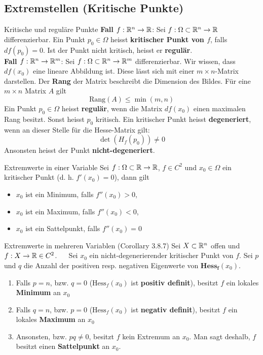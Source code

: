 \subsection{Extremstellen (Kritische Punkte)}

\begin{Definition}[label=R1]{Kritische und reguläre Punkte}{}
	\textbf{Fall $f: \mathbb{R}^n \to \mathbb{R}$}: Sei 	$f: \Omega \subset \mathbb{R}^n \to \mathbb{R}$ differenzierbar. Ein Punkt $p_0 \in \Omega$ heisst \textbf{kritischer Punkt von $f$}, falls $df(p_0)=0$. Ist der Punkt nicht kritisch, heisst er \textbf{regulär}.\\
	
	\textbf{Fall $f: \mathbb{R}^n \to \mathbb{R}^m$}: Sei $f: \Omega \subset \mathbb{R}^n \to \mathbb{R}^m$ differenzierbar. Wir wissen, dass $df(x_0)$ eine lineare Abbildung ist.
	Diese lässt sich mit einer $m\times n$-Matrix darstellen. Der \textbf{Rang} der Matrix beschreibt die Dimension des Bildes.
	Für eine $m \times n$ Matrix $A$ gilt \[\text{Rang}(A) \leq \min(m, n)\] Ein Punkt $p_0 \in \Omega$ heisst \textbf{regulär},
	wenn die Matrix $df(x_0)$ einen maximalen Rang besitzt. Sonst heisst $p_0$ kritisch.
	Ein kritischer Punkt heisst \textbf{degeneriert}, wenn an dieser Stelle für die Hesse-Matrix gilt:
	\[\det(H_f(p_0)) \neq 0\]
	Ansonsten heisst der Punkt \textbf{nicht-degeneriert}.
\end{Definition}

\begin{Satz}{Extremwerte in einer Variable}{}
	Sei $f: \Omega \subset \mathbb{R} \to \mathbb{R}$, $f \in C^2$ und $x_0 \in \Omega$ ein kritischer Punkt (d. h. $f'(x_0) = 0$), dann gilt
	\begin{itemize}
		\item $x_0$ ist ein Minimum, falls $f''(x_0) > 0$,
		\item $x_0$ ist ein Maximum, falls $f''(x_0) < 0$,
		\item $x_0$ ist ein Sattelpunkt, falls $f''(x_0) = 0$
	\end{itemize}
\end{Satz}

\begin{Satz}{Extremwerte in mehreren Variablen (Corollary 3.8.7)}{}
	Sei $X\subset \mathbb{R}^n$ offen und $f: X \rightarrow \mathbb{R} \in C^2$. ~~
	Sei $x_0$ ein nicht-degenerierender kritischer Punkt von $f$. Sei $p$ und $q$ die Anzahl der positiven resp. negativen Eigenwerte von $\mathbf{Hess_f}(x_0)$.

	\begin{enumerate}
		\item Falls $p=n$, bzw. $q=0$ ($\text{Hess}_f(x_0)$ ist \textbf{positiv definit}), besitzt $f$ ein lokales \textbf{Minimum} an $x_0$
		\item Falls $q=n$, bzw. $p=0$ ($\text{Hess}_f(x_0)$ ist \textbf{negativ definit}), besitzt $f$ ein lokales \textbf{Maximum} an $x_0$
		\item Ansonsten, bzw. $pq\neq 0$, besitzt $f$ kein Extremum an $x_0$. Man sagt deshalb, $f$ besitzt einen \textbf{Sattelpunkt} an $x_0$.
	\end{enumerate}
\end{Satz}

